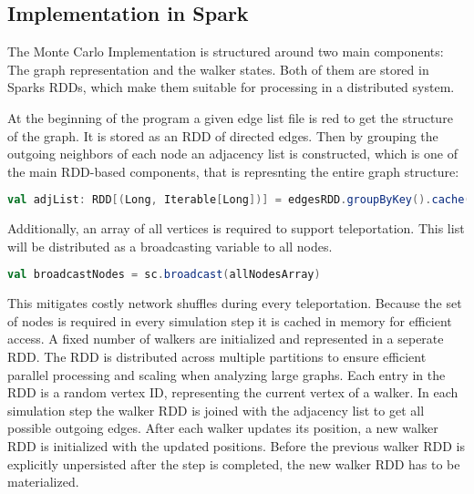 \subsection{Implementation in Spark}
The Monte Carlo Implementation is structured around two main components: The graph representation and the walker states. Both of them are stored in Sparks RDDs, which make them suitable for processing in a distributed system.

At the beginning of the program a given edge list file is red to get the structure of the graph. It is stored as an RDD of directed edges. Then by grouping the outgoing neighbors of each node an adjacency list is constructed, which is one of the main RDD-based components, that is represnting the entire graph structure:

\vspace{0.5em}
\begin{lstlisting}[language=Scala, caption={Adjacency list creation}, label={lst:adjlist}]
val adjList: RDD[(Long, Iterable[Long])] = edgesRDD.groupByKey().cache()
\end{lstlisting}
\vspace{0.5em}

Additionally, an array of all vertices is required to support teleportation. This list will be distributed as a broadcasting variable to all nodes.

\vspace{0.5em}
\begin{lstlisting}[language=Scala, caption={Broadcasting Variable}, label={lst:broadcast}]
val broadcastNodes = sc.broadcast(allNodesArray)
\end{lstlisting}
\vspace{0.5em}

This mitigates costly network shuffles during every teleportation. Because the set of nodes is required in every simulation step it is cached in memory for efficient access.
A fixed number of walkers are initialized and represented in a seperate RDD. The RDD is distributed across multiple partitions to ensure efficient parallel processing and scaling when analyzing large graphs. Each entry in the RDD is a random vertex ID, representing the current vertex of a walker. In each simulation step the walker RDD is joined with the adjacency list to get all possible outgoing edges. After each walker updates its position, a new walker RDD is initialized with the updated positions. Before the previous walker RDD is explicitly unpersisted after the step is completed, the new walker RDD has to be materialized. 


